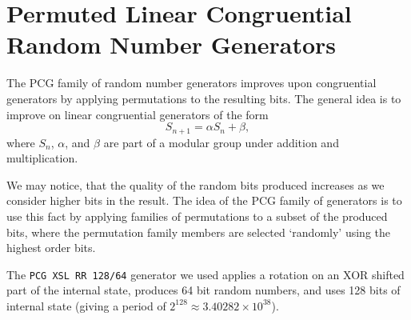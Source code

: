 \documentclass[10pt, a4paper]{article}
\begin{document}
\section{Permuted Linear Congruential Random Number Generators}
\label{app:pcg}

The PCG family of random number generators improves upon congruential generators by applying
permutations to the resulting bits\cite{pcg}. The general idea is to improve on linear congruential
generators of the form
\begin{equation}
S_{n+1} = \alpha S_n + \beta,
\end{equation}
where $S_n$, $\alpha$, and $\beta$ are part of a modular group under addition and multiplication.

We may notice, that the quality of the random bits produced increases as we consider higher bits
in the result\cite{pcg}. The idea of the PCG family of generators is to use this fact by
applying families of permutations to a subset of the produced bits, where the permutation family
members are selected `randomly' using the highest order bits.

The \texttt{PCG XSL RR 128/64} generator we used applies a rotation on an XOR shifted part of the
internal state, produces 64 bit random numbers, and uses 128 bits of internal state (giving a
period of $2^{128} \approx 3.40282\times10^{38}$)\cite{pcg}.
\end{document}
